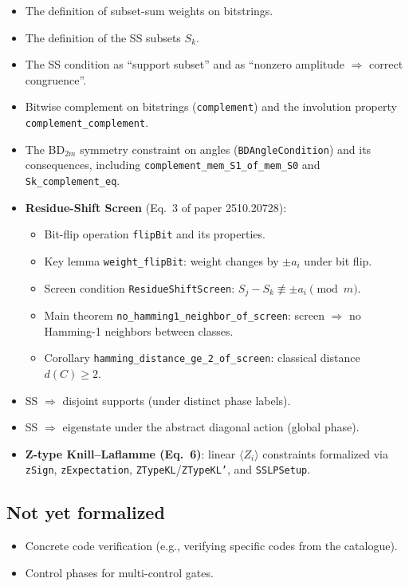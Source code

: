 \documentclass[11pt]{article}
\begin{document}
\begin{itemize}
\item The definition of subset-sum weights on bitstrings.
\item The definition of the SS subsets $S_k$.
\item The SS condition as ``support subset'' and as ``nonzero amplitude $\Rightarrow$ correct congruence''.
\item Bitwise complement on bitstrings (\texttt{complement}) and the involution property \texttt{complement\_complement}.
\item The BD$_{2m}$ symmetry constraint on angles (\texttt{BDAngleCondition}) and its consequences, including \texttt{complement\_mem\_S1\_of\_mem\_S0} and \texttt{Sk\_complement\_eq}.
\item \textbf{Residue-Shift Screen} (Eq.~3 of paper 2510.20728):
  \begin{itemize}
  \item Bit-flip operation \texttt{flipBit} and its properties.
  \item Key lemma \texttt{weight\_flipBit}: weight changes by $\pm a_i$ under bit flip.
  \item Screen condition \texttt{ResidueShiftScreen}: $S_j - S_k \not\equiv \pm a_i \pmod{m}$.
  \item Main theorem \texttt{no\_hamming1\_neighbor\_of\_screen}: screen $\Rightarrow$ no Hamming-1 neighbors between classes.
  \item Corollary \texttt{hamming\_distance\_ge\_2\_of\_screen}: classical distance $d(C) \geq 2$.
  \end{itemize}
\item SS $\Rightarrow$ disjoint supports (under distinct phase labels).
\item SS $\Rightarrow$ eigenstate under the abstract diagonal action (global phase).
\item \textbf{Z-type Knill--Laflamme (Eq.~6)}: linear $\langle Z_i \rangle$ constraints formalized via \texttt{zSign}, \texttt{zExpectation}, \texttt{ZTypeKL}/\texttt{ZTypeKL'}, and \texttt{SSLPSetup}.
\end{itemize}

\subsection*{Not yet formalized}

\begin{itemize}
\item Concrete code verification (e.g., verifying specific codes from the catalogue).
\item Control phases for multi-control gates.
\end{itemize}
\end{document}
